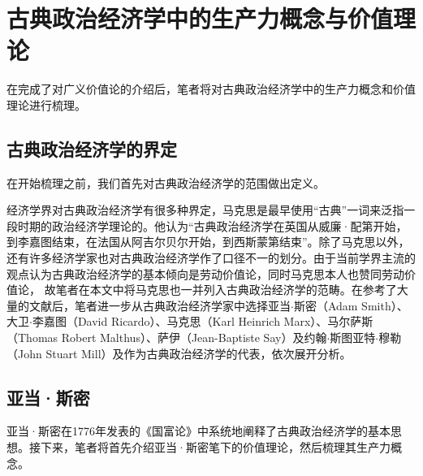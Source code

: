 
\chapter{古典政治经济学中的生产力概念与价值理论}

在完成了对广义价值论的介绍后，笔者将对古典政治经济学中的生产力概念和价值理论进行梳理。

\section{古典政治经济学的界定}

在开始梳理之前，我们首先对古典政治经济学的范围做出定义。

经济学界对古典政治经济学有很多种界定，马克思是最早使用“古典”一词来泛指一段时期的政治经济学理论的\cite[7]{YueHan*MeiNaDe*KaiEnSiJiuYeLiXiHeHuoBiTongLunChongYiBen2021}。他认为“古典政治经济学在英国从威廉·配第开始，到李嘉图结束，在法国从阿吉尔贝尔开始，到西斯蒙第结束”\cite[56]{QiaEr*MaKeSiZhengZhiJingJiXuePiPanYingWenBan2022}。除了马克思以外，还有许多经济学家也对古典政治经济学作了口径不一的划分\cite[5-8]{CaiJiMingCongGuDianZhengZhiJingJiXueDaoZhongGuoTeSeSheHuiZhuYiZhengZhiJingJiXueJiYuZhongGuoShiJiaoDeZhengZhiJingJiXueYanBianShangCe2023}。由于当前学界主流的观点\cite[56]{QiaEr*MaKeSiZhengZhiJingJiXuePiPanYingWenBan2022}\cite[45]{ChenDaiSunCongGuDianJingJiXuePaiDaoMaKeSiRuoGanZhuYaoXueShuoFaZhanLueLun2014}\cite[12]{CaiJiMingCongGuDianZhengZhiJingJiXueDaoZhongGuoTeSeSheHuiZhuYiZhengZhiJingJiXueJiYuZhongGuoShiJiaoDeZhengZhiJingJiXueYanBianShangCe2023}认为古典政治经济学的基本倾向是劳动价值论，同时马克思本人也赞同劳动价值论，
故笔者在本文中将马克思也一并列入古典政治经济学的范畴。在参考了大量的文献后，笔者进一步从古典政治经济学家中选择亚当$\cdot$斯密（Adam  Smith）、大卫$\cdot$李嘉图（David Ricardo）、马克思（Karl Heinrich Marx）、马尔萨斯（Thomas Robert Malthus）、萨伊（Jean-Baptiste Say）及约翰$\cdot$斯图亚特$\cdot$穆勒（John Stuart Mill）及作为古典政治经济学的代表，依次展开分析。

\section{亚当·斯密}
 
亚当·斯密在1776年发表的《国富论》中系统地阐释了古典政治经济学的基本思想\cite[120]{CaiJiMingCongGuDianZhengZhiJingJiXueDaoZhongGuoTeSeSheHuiZhuYiZhengZhiJingJiXueJiYuZhongGuoShiJiaoDeZhengZhiJingJiXueYanBianShangCe2023}\cite[90]{YanZhiJieXiFangJingJiXueShuoShiJiaoChengDiErBan2013}。接下来，笔者将首先介绍亚当·斯密笔下的价值理论，然后梳理其生产力概念。

